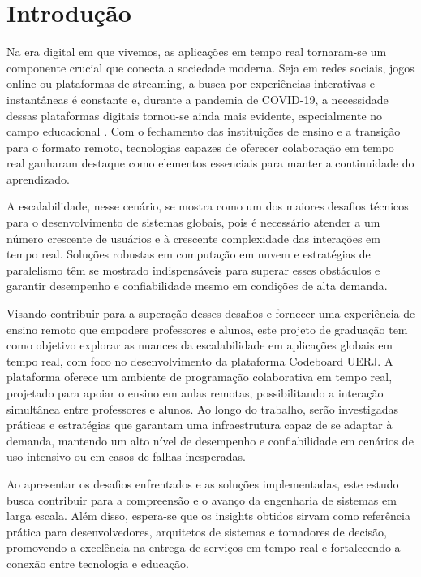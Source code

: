 \chapter*{Introdução}

Na era digital em que vivemos, as aplicações em tempo real tornaram-se um componente crucial que conecta a sociedade moderna. Seja em redes sociais, jogos online ou plataformas de streaming, a busca por experiências interativas e instantâneas é constante e, durante a pandemia de COVID-19, a necessidade dessas plataformas digitais tornou-se ainda mais evidente, especialmente no campo educacional \cite{impact-covid19-teaching-learning}. Com o fechamento das instituições de ensino e a transição para o formato remoto, tecnologias capazes de oferecer colaboração em tempo real ganharam destaque como elementos essenciais para manter a continuidade do aprendizado.

A escalabilidade, nesse cenário, se mostra como um dos maiores desafios técnicos para o desenvolvimento de sistemas globais, pois é necessário atender a um número crescente de usuários e à crescente complexidade das interações em tempo real. Soluções robustas em computação em nuvem e estratégias de paralelismo têm se mostrado indispensáveis para superar esses obstáculos e garantir desempenho e confiabilidade mesmo em condições de alta demanda.

Visando contribuir para a superação desses desafios e fornecer uma experiência de ensino remoto que empodere professores e alunos, este projeto de graduação tem como objetivo explorar as nuances da escalabilidade em aplicações globais em tempo real, com foco no desenvolvimento da plataforma Codeboard UERJ. A plataforma oferece um ambiente de programação colaborativa em tempo real, projetado para apoiar o ensino em aulas remotas, possibilitando a interação simultânea entre professores e alunos. Ao longo do trabalho, serão investigadas práticas e estratégias que garantam uma infraestrutura capaz de se adaptar à demanda, mantendo um alto nível de desempenho e confiabilidade em cenários de uso intensivo ou em casos de falhas inesperadas.

Ao apresentar os desafios enfrentados e as soluções implementadas, este estudo busca contribuir para a compreensão e o avanço da engenharia de sistemas em larga escala. Além disso, espera-se que os insights obtidos sirvam como referência prática para desenvolvedores, arquitetos de sistemas e tomadores de decisão, promovendo a excelência na entrega de serviços em tempo real e fortalecendo a conexão entre tecnologia e educação.

